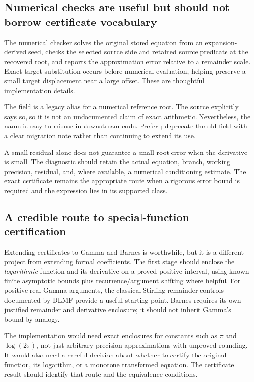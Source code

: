 \documentclass[11pt,a4paper]{article}
\newcommand{\code}[1]{\texttt{\detokenize{#1}}}
\theoremstyle{definition}
\begin{document}
\subsection{Numerical checks are useful but should not borrow certificate vocabulary}

The numerical checker solves the original stored equation from an expansion-derived seed, checks the selected source side and retained source predicate at the recovered root, and reports the approximation error relative to a remainder scale. Exact target substitution occurs before numerical evaluation, helping preserve a small target displacement near a large offset. These are thoughtful implementation details.\cite{numerical}

The \code{"ExactInverse"} field is a legacy alias for a numerical reference root. The source explicitly says so, so it is not an undocumented claim of exact arithmetic. Nevertheless, the name is easy to misuse in downstream code. Prefer \code{"ReferenceRoot"}; deprecate the old field with a clear migration note rather than continuing to extend its use.

A small residual alone does not guarantee a small root error when the derivative is small. The diagnostic should retain the actual equation, branch, working precision, residual, and, where available, a numerical conditioning estimate. The exact certificate remains the appropriate route when a rigorous error bound is required and the expression lies in its supported class.

\subsection{A credible route to special-function certification}

Extending certificates to Gamma and Barnes is worthwhile, but it is a different project from extending formal coefficients. The first stage should enclose the \emph{logarithmic} function and its derivative on a proved positive interval, using known finite asymptotic bounds plus recurrence/argument shifting where helpful. For positive real Gamma arguments, the classical Stirling remainder controls documented by DLMF provide a useful starting point. Barnes requires its own justified remainder and derivative enclosure; it should not inherit Gamma's bound by analogy.\cite{dlmf-gamma,dlmf-barnes}

The implementation would need exact enclosures for constants such as $\pi$ and $\log(2\pi)$, not just arbitrary-precision approximations with unproved rounding. It would also need a careful decision about whether to certify the original function, its logarithm, or a monotone transformed equation. The certificate result should identify that route and the equivalence conditions.
\end{document}
